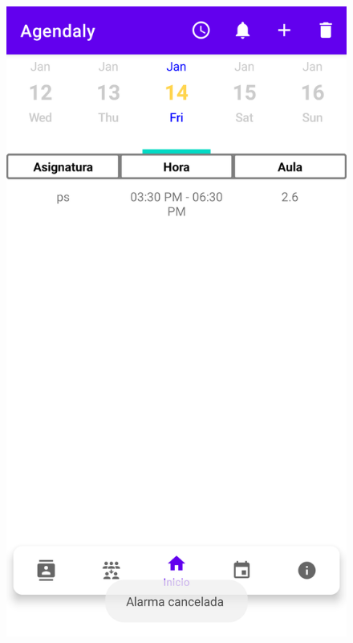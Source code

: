 \documentclass[a4paper,openright,12pt]{article}
\begin{document}
\begin{figure}
        \includegraphics[scale=0.05]{notificacion5.png} 

\end{figure}
\end{document}
